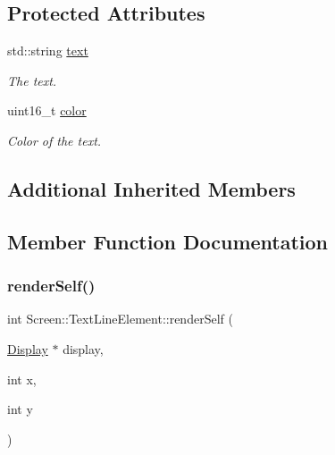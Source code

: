 \subsection*{Protected Attributes}
\begin{DoxyCompactItemize}
\item 
\mbox{\label{classScreen_1_1TextLineElement_ad2495931e2dd28b0d7cb5d8c761dedad}} 
std\+::string \mbox{\hyperlink{classScreen_1_1TextLineElement_ad2495931e2dd28b0d7cb5d8c761dedad}{text}}
\begin{DoxyCompactList}\small\item\em The text. \end{DoxyCompactList}\item 
\mbox{\label{classScreen_1_1TextLineElement_ac4fa4d52ead8e4b38ba18c673875fae2}} 
uint16\+\_\+t \mbox{\hyperlink{classScreen_1_1TextLineElement_ac4fa4d52ead8e4b38ba18c673875fae2}{color}}
\begin{DoxyCompactList}\small\item\em Color of the text. \end{DoxyCompactList}\end{DoxyCompactItemize}
\subsection*{Additional Inherited Members}


\subsection{Member Function Documentation}
\mbox{\label{classScreen_1_1TextLineElement_abcd2e0700f84bb19d7a285345cd37871}} 
\subsubsection{\texorpdfstring{render\+Self()}{renderSelf()}}
{\footnotesize\ttfamily int Screen\+::\+Text\+Line\+Element\+::render\+Self (\begin{DoxyParamCaption}\item[{\mbox{\hyperlink{classDisplay}{Display}} $\ast$}]{display,  }\item[{int}]{x,  }\item[{int}]{y }\end{DoxyParamCaption})\hspace{0.3cm}{\ttfamily [virtual]}}



